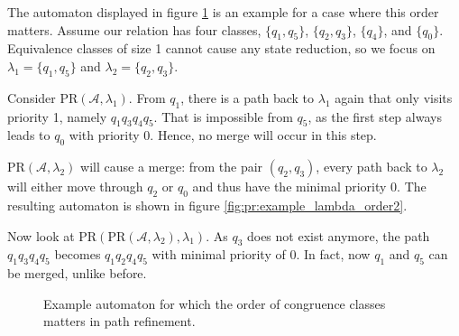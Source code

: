 The automaton displayed in figure \ref{fig:pr:example_lambda_order} is an example for a case where this order matters. Assume our relation has four classes, $\{q_1, q_5\}$, $\{q_2, q_3\}$, $\{q_4\}$, and $\{q_0\}$. Equivalence classes of size 1 cannot cause any state reduction, so we focus on $\lambda_1 = \{q_1, q_5\}$ and $\lambda_2 = \{q_2, q_3\}$.

Consider $\text{PR}(\mathcal{A}, \lambda_1)$. From $q_1$, there is a path back to $\lambda_1$ again that only visits priority 1, namely $q_1 q_3 q_4 q_5$. That is impossible from $q_5$, as the first step always leads to $q_0$ with priority 0. Hence, no merge will occur in this step.

$\text{PR}(\mathcal{A}, \lambda_2)$ will cause a merge: from the pair $(q_2, q_3)$, every path back to $\lambda_2$ will either move through $q_2$ or $q_0$ and thus have the minimal priority 0. The resulting automaton is shown in figure \ref{fig:pr:example_lambda_order2}.

Now look at $\text{PR}(\text{PR}(\mathcal{A}, \lambda_2), \lambda_1)$. As $q_3$ does not exist anymore, the path $q_1 q_3 q_4 q_5$ becomes $q_1 q_2 q_4 q_5$ with minimal priority of 0. In fact, now $q_1$ and $q_5$ can be merged, unlike before.


\begin{figure}
\centering
{}
\caption{Example automaton for which the order of congruence classes matters in path refinement.}
\label{fig:pr:example_lambda_order}
\end{figure}


